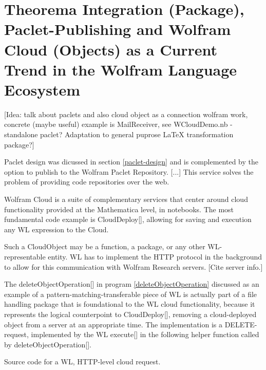 \section{Theorema Integration (Package), Paclet-Publishing and Wolfram Cloud (Objects) as a Current Trend in the Wolfram Language Ecosystem} \label{integration-publishing-cloud}

[Idea: talk about paclets and also cloud object as a connection wolfram work, concrete (maybe useful) example is MailReceiver, see WCloudDemo.nb - standalone paclet? Adaptation to general puprose LaTeX transformation package?]

Paclet design was dicussed in section \ref{paclet-design} and is complemented by the option to publish to the Wolfram Paclet Repository. [...] This service solves the problem of providing code repositories over the web.

Wolfram Cloud is a suite of complementary services that center around cloud functionality provided at the Mathematica level, in notebooks. The most fundamental code example is CloudDeploy[], allowing for saving and execution any WL expression to the Cloud.

Such a CloudObject may be a function, a package, or any other WL-representable entity. WL has to implement the HTTP protocol in the background to allow for this communication with Wolfram Research servers. [Cite server info.]

The deleteObjectOperation[] in program \ref{deleteObjectOperation} discussed as an example of a pattern-matching-transferable piece of WL is actually part of a file handling package that is foundational to the WL cloud functionality, because it represents the logical counterpoint to CloudDeploy[], removing a cloud-deployed object from a server at an appropriate time. The implementation is a DELETE-request, implemented by the WL execute[] in the following helper function called by deleteObjectOperation[].

\begin{program} 
\caption{Source code for a WL, HTTP-level cloud request.}
\label{deleteCloudObject}
\end{program}

